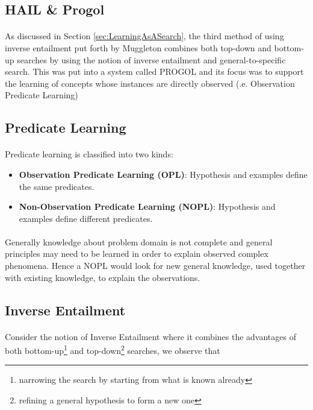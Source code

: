 \documentclass{article}
\theoremstyle{plain}
\theoremstyle{definition}
\begin{document}
\begin{multicols}{2}
\section{HAIL \& Progol}

\paragraph{} As discussed in Section \ref{sec:LearningAsASearch}, the third method of using inverse entailment put forth by Muggleton combines both top-down and bottom-up searches by using the notion of inverse entailment and general-to-specific search. This was put into a system called PROGOL and its focus was to support the learning of concepts whose instances are directly observed (.e. Observation Predicate Learning)

\subsection{Predicate Learning}

\paragraph{} Predicate learning is classified into two kinds:

\begin{itemize}
\item \textbf{Observation Predicate Learning (OPL)}: Hypothesis and examples define the same predicates. 
\item \textbf{Non-Observation Predicate Learning (NOPL)}: Hypothesis and examples define different predicates.
\end{itemize}

\paragraph{} Generally knowledge about problem domain is not complete and general principles may need to be learned in order to explain observed complex phenomena. Hence a NOPL would look for new general knowledge, used together with existing knowledge, to explain the observations. 

\subsection{Inverse Entailment}

\paragraph{} Consider the notion of Inverse Entailment where it combines the advantages of both bottom-up\footnote{narrowing the search by starting from what is known already} and top-down\footnote{refining a general hypothesis to form a new one} searches, we observe that


\end{multicols}
\end{document}
